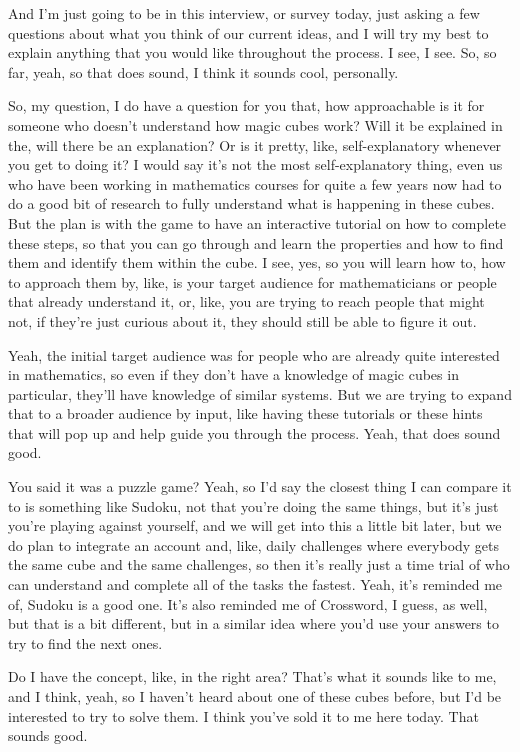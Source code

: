 \documentclass{article}
\begin{document}
And I'm just going to be in this interview, or survey today, just asking a few questions about what
you think of our current ideas, and I will try my best to explain anything that you would like
throughout the process. I see, I see. So, so far, yeah, so that does sound, I think it sounds cool,
personally.

So, my question, I do have a question for you that, how approachable is it for someone who
doesn't understand how magic cubes work? Will it be explained in the, will there be an
explanation? Or is it pretty, like, self-explanatory whenever you get to doing it? I would say it's not
the most self-explanatory thing, even us who have been working in mathematics courses for quite
a few years now had to do a good bit of research to fully understand what is happening in these
cubes. But the plan is with the game to have an interactive tutorial on how to complete these
steps, so that you can go through and learn the properties and how to find them and identify them
within the cube. I see, yes, so you will learn how to, how to approach them by, like, is your target
audience for mathematicians or people that already understand it, or, like, you are trying to reach
people that might not, if they're just curious about it, they should still be able to figure it out.

Yeah, the initial target audience was for people who are already quite interested in mathematics,
so even if they don't have a knowledge of magic cubes in particular, they'll have knowledge of
similar systems. But we are trying to expand that to a broader audience by input, like having
these tutorials or these hints that will pop up and help guide you through the process. Yeah, that
does sound good.

You said it was a puzzle game? Yeah, so I'd say the closest thing I can compare it to is
something like Sudoku, not that you're doing the same things, but it's just you're playing against
yourself, and we will get into this a little bit later, but we do plan to integrate an account and, like,
daily challenges where everybody gets the same cube and the same challenges, so then it's
really just a time trial of who can understand and complete all of the tasks the fastest. Yeah, it's
reminded me of, Sudoku is a good one. It's also reminded me of Crossword, I guess, as well, but
that is a bit different, but in a similar idea where you'd use your answers to try to find the next
ones.

Do I have the concept, like, in the right area? That's what it sounds like to me, and I think, yeah,
so I haven't heard about one of these cubes before, but I'd be interested to try to solve them. I
think you've sold it to me here today. That sounds good.
\end{document}
